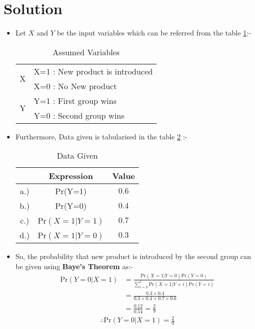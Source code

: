 \documentclass[journal,12pt,twocolumn]{IEEEtran}
\begin{document}
\section{Solution}
\begin{itemize}
\item Let $X$ and $Y$ be the input variables which can be referred from the table \ref{tab:table1}:-
\begin{table}[ht!]
\begin{center}
\begin{tabular}{|l|l|}
\hline
\multirow{2}{*}{X} & X=1 : New product is introduced \\ \cline{2-2} 
                   & X=0 : No New product \\ \hline
\multirow{2}{*}{Y} & Y=1 :  First group wins            \\ \cline{2-2} 
                   & Y=0 : Second group wins \\ \hline
\end{tabular}
\end{center}
\caption{Assumed Variables}
\label{tab:table1}
\end{table} 
\item Furthermore, Data given is tabularised in the table \ref{tab:table2} :-
\begin{table}[ht!]
\begin{center}
\begin{tabular}{|c|c|c|}
\hline
 &Expression & Value \\
\hline 
a.)&Pr(Y=1) & $0.6$ \\ 
\hline 
b.)&Pr(Y=0) & $0.4$ \\ 
\hline 
c.)&Pr$(X=1|Y=1)$ & $0.7$ \\ 
\hline 
d.)&Pr$(X=1|Y=0)$ & $0.3$ \\ 
\hline 
\end{tabular}
\end{center}
\caption{Data Given}
\label{tab:table2}
\end{table}
\item So, the probability that new product is introduced by the second group can be given using \textbf{Baye's Theorem} as:-
\begin{align}
    \text{Pr}(Y=0|X=1) &= \frac{\text{Pr}(X=1|Y=0)\text{Pr}(Y=0)}{ \sum_{i=0}^{1}\text{Pr}(X=1|Y=i)\text{Pr}(Y=i)}
    \\
    &= \frac{0.3\times 0.4}{0.3\times0.4+0.7 \times 0.6 }
    \\
    &= \frac{0.12}{0.54} =\frac{2}{9}
   \end{align}
   \begin{align}
   \boxed{\therefore \text{Pr}(Y=0|X=1)= \frac{2}{9}}
\end{align}
\end{itemize}
\end{document}

